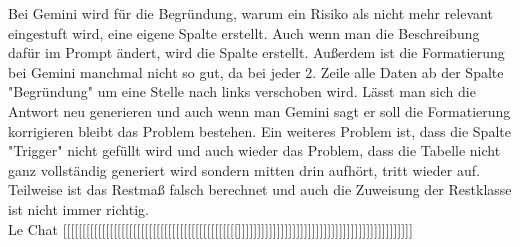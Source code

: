Bei Gemini wird für die Begründung, warum ein Risiko als nicht mehr relevant eingestuft wird, eine eigene Spalte erstellt.
Auch wenn man die Beschreibung dafür im Prompt ändert, wird die Spalte erstellt. Außerdem ist die Formatierung bei Gemini
manchmal nicht so gut, da bei jeder 2. Zeile alle Daten ab der Spalte "Begründung" um eine Stelle nach links verschoben wird.
Lässt man sich die Antwort neu generieren und auch wenn man Gemini sagt er soll die Formatierung korrigieren bleibt das 
Problem bestehen. Ein weiteres Problem ist, dass die Spalte "Trigger" nicht gefüllt wird und auch wieder das Problem, dass
die Tabelle nicht ganz vollständig generiert wird sondern mitten drin aufhört, tritt wieder auf. Teilweise ist das Restmaß 
falsch berechnet und auch die Zuweisung der Restklasse ist nicht immer richtig.\\

Le Chat [[[[[[[[[[[[[[[[[[[[[[[[[[[[[[[[[[[[[[[[[[[[[]]]]]]]]]]]]]]]]]]]]]]]]]]]]]]]]]]]]]]]]]]]]]



